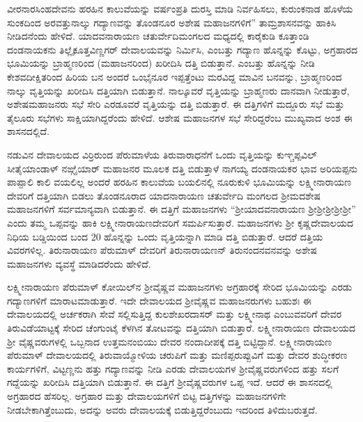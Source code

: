 ವೀರನಾರಸಿಂಹದೇವನು ಹರಹಿನ ಕಾಲುವೆಯನ್ನು ವರ್ಷಂಪ್ರತಿ ದುರಸ್ತಿ ಮಾಡಿ ನಿರ್ವಹಿಸಲು, ಕುರುಂಕನಾಡ ಹೊಳೆಯ ಸುಂಕದಿಂದ ಅರವತ್ತುನಾಲ್ಕು ಗದ್ಯಾಣವನ್ನು ತೊಂಡನೂರ ಅಶೇಷ ಮಹಾಜನಗಳಿಗೆ” ತಾಮ್ರಶಾಸನವನ್ನು ಹಾಕಿಸಿ ನೀಡಿದನೆಂದು ಹೇಳಿದೆ. ಯಾದವನಾರಾಯಣ ಚತುರ್ವೇದಿಮಂಗಲದ ಮಧ್ಯದಲ್ಲಿ ಕಾರೈಕುಡಿ ಕೂತ್ತಾಂಡಿ ದಂಡನಾಯಕನು ತಿಲ್ಲೈಕೂತ್ತವಿಣ್ಣಗರ್​ ದೇವಾಲಯವನ್ನು ನಿರ್ಮಿಸಿ, ಎಂಬತ್ತು ಗದ್ಯಾಣ ಹೊನ್ನನ್ನು ಕೊಟ್ಟು, ಅಗ್ರಹಾರದ ಭೂಮಿಯನ್ನು ಬ್ರಾಹ್ಮಣರಿಂದ (ಮಹಾಜನರಿಂದ) ಖರೀದಿಸಿ ದತ್ತಿ ಬಿಡುತ್ತಾನೆ. ಎಂಬತ್ತು ಹೊನ್ನನ್ನು ನೀಡಿ ಕೇಶವದೀಕ್ಷಿತರಿಂದ ಹಿರಿಯ ಬನ ಅಂದರೆ ಒಂಭೈನೂರ ಇಪ್ಪತ್ತೆಂಟು ಮರವಿದ್ದ ಮಾವಿನ ಬನವನ್ನು, ಬ್ರಾಹ್ಮಣರಿಂದ ನಾಲ್ಕು ವೃತ್ತಿಯನ್ನು ಖರೀದಿಸಿ ದತ್ತಿಯಾಗಿ ಬಿಡುತ್ತಾನೆ. ನಾಲ್ಕೂವರೆ ವೃತ್ತಿಯನ್ನು ಬ್ರಾಹ್ಮಣರು ದಾನವಾಗಿ ನೀಡುತ್ತಾರೆ, ಅಶೇಷಮಹಾಜನರು ಸಭೆ ಸೇರಿ ಎರಡೂವರೆ ವೃತ್ತಿಯನ್ನು ದತ್ತಿ ಬಿಡುತ್ತಾರೆ. ಈ ದತ್ತಿಗಳಿಗೆ ಮದ್ದೂರು ಸಭೆ ಮತ್ತು ತೈಲೂರು ಸಭೆಗಳು ಸಾಕ್ಷಿಯಾಗಿದ್ದರೆಂದು ಹೇಳಿದೆ. ಆಶೇಷ ಮಹಾಜನಗಳ ಸಭೆ ಸೇರಿದ್ದರೆಂಬ ಮುಖ್ಯವಾದ ಅಂಶ ಈ ಶಾಸನದಲ್ಲಿದೆ.

ನಡುವಿನ ದೇವಾಲಯದ ವಿರ್ರಿರುಂದ ಪೆರುಮಾಳೆಯ ತಿರುವಾರಾಧನೆಗೆ ಒಂದು ವೃತ್ತಿಯನ್ನು ಕುಞ್ಚಪ್ಪವಿಲ್​ ಸೀತೈಯಾಂಡಾಳ್​ ನಙ್ಗೈಯಾರ್​ ಮಹಾಜನರ ಮೂಲಕ ದತ್ತಿ ಬಿಡುತ್ತಾಳೆ ನಾಗಯ್ಯ ದಂಡನಾಯಕರ ಭಾವ ಅರಿಯಪ್ಪನು ಪಾಪ್ಪಾಲಿ ಕಾಲಿ ವಯಲಿಲ್ಲ ಅಂದರೆ ಹರಹಿನ ಕಾಲುವೆಯ ಬಯಲಿನಲ್ಲಿ ನೂರುಕುಳಿ ಭೂಮಿಯನ್ನು ಲಕ್ಷ್ಮೀನಾರಾಯಣ ದೇವರಿಗೆ ದತ್ತಿಯಾಗಿ ಬಿಡಲು ತೊಂಡನೂರಾದ ಯಾದನಾರಾಯಣ ಚತುರ್ವೇದಿ ಮಂಗಲದ ಶ‍್ರೀಮದಶೇಷ ಮಹಾಜನಗಳಿಗೆ ಸರ್ವಮಾನ್ಯವಾಗಿ ಬಿಡುತ್ತಾನೆ. ಈ ದತ್ತಿಗೆ ಮಹಾಜನಗಳು “ಶ‍್ರೀಯಾದವನಾರಾಯಣ ಶ‍್ರೀಶ‍್ರೀಶ‍್ರೀಶ‍್ರೀಶ‍್ರೀ” ಎಂದು ತಮ್ಮ ಒಪ್ಪವನ್ನು ಹಾಕಿ ಲಕ್ಷ್ಮೀನಾರಾಯಣದೇವರಿಗೆ ಸಮರ್ಪಿಸುತ್ತಾರೆ. ಮಹಾಜನಗಳು ಶ‍್ರೀ ಕೃಷ್ಣದೇವಾಲಯದ ನಿಧಿಯ ಬಡ್ಡಿಯಿಂದ ಬಂದ 20 ಹೊನ್ನನ್ನು ಒಂದು ವೃತ್ತಿಯನ್ನಾಗಿ ಮಾಡಿ ದತ್ತಿ ಬಿಡುತ್ತಾರೆ. ಆದರೆ ದತ್ತಿಯ ವಿವರಗಳಿಲ್ಲ. ತಿರುನಾರಾಯಣ ಪೆರುಮಾಳ್​ ದೇವರಿಗೆ ತಿರುನಾರಾಯಣನ್​ ತಿರುನಂದನವನವನ್ನು ಅಶೇಷ ಮಹಾಜನಗಳು ವ್ಯವಸ್ಥೆ ಮಾಡಿದರೆಂದು ಹೇಳಿದೆ.

ಲಕ್ಷ್ಮೀನಾರಾಯಣ ಪೆರುಮಾಳ್​ ಕೋಯಿಲ್​ನ ಶ‍್ರೀವೈಷ್ಣವ ಮಹಾಜನಗಳು ಅಗ್ರಹಾರಕ್ಕೆ ಸೇರಿದ ಭೂಮಿಯನ್ನು ಎರಡು ಗದ್ಯಾಣಗಳಿಗೆ ಮಾರಾಟಮಾಡುತ್ತಾರೆ. ಇದೇ ದೇವಾಲಯದ ಶ‍್ರೀವೈಷ್ಣವ ಮಹಾಜನರುಗಳು ಬಹುಶಃ ಈ ದೇವಾಲಯದಲ್ಲಿ ಅರ್ಚಕರಾಗಿ ಸೇವೆ ಸಲ್ಲಿಸುತ್ತಿದ್ದ ಕುಲಶೇಖರದಾಸರ್​ ಮತ್ತು ಲಕ್ಷ್ಮೀನಾಥ ಎಂಬುವವರಿಗೆ ದೇವರ ತಿರುವಿಡೆಯಾಟ್ಟಕ್ಕೆ ಸೇರಿದ ಚೆಂಗುಂಟೈ ಕೆಳಗಿನ ತೋಟವನ್ನು ದತ್ತಿಯಾಗಿ ಬಿಡುತ್ತಾರೆ. ಲಕ್ಷ್ಮೀನಾರಾಯಣ ದೇವಾಲಯದ ಶ‍್ರೀ ವೈಷ್ಣವರುಗಳಲ್ಲಿ ಒಬ್ಬನಾದ ಉತ್ತಮನಂಬಿಯು ದೇವರ ನಂದಾದೀಪಕ್ಕೆ ದತ್ತಿ ಬಿಟ್ಟಿದ್ದಾನೆ. ಲಕ್ಷ್ಮೀನಾರಾಯಣ ಪೆರುಮಾಳ್​ ದೇವಾಲಯದಲ್ಲಿ ತಿರುವಾಯ್ಮೋಳಿಯ ಚರುಪಿಗೆ ಮತ್ತು ಮಣಿಪ್ಪರುಪ್ಪುವಿಗೆ ಮತ್ತು ದೇವರ ಶುದ್ಧೀಕರಣ ಕಾರ್ಯಗಳಿಗೆ, ವಿಟ್ಟಣ್ಣನು ಹತ್ತು ಗದ್ಯಾಣವನ್ನು ನೀಡಿ ಎರಡು ದೇವಾಲಯಗಳ ಶ‍್ರೀವೈಷ್ಣವರುಗಳಿಂದ ಹತ್ತು ಸಲಗೆ ಗದ್ದೆಯನ್ನು ಖರೀದಿಸಿ ದತ್ತಿಯಾಗಿ ಬಿಡುತ್ತಾನೆ. ಈ ದತ್ತಿಗೆ ಶ‍್ರೀವೈಷ್ಣವರುಗಳ ಒಪ್ಪ ಇದೆ. ಆದರೆ ಈ ಶಾಸನದಲ್ಲಿ ಅಗ್ರಹಾರದ ಹೆಸರಿಲ್ಲ. ಅಗ್ರಹಾರ ಮತ್ತು ದೇವಾಲಯಗಳಿಗೆ ಬಿಟ್ಟ ದತ್ತಿಗಳನ್ನು ಮಹಾಜನಗಳಿಗೇ ನೀಡಬೇಕಾಗಿತ್ತೆಂಬುದು, ಅದನ್ನು ಅವರು ದೇವಾಲಯಕ್ಕೆ ಬಿಡುತ್ತಿದ್ದರೆಂಬುದು ಇದರಿಂದ ತಿಳಿದುಬರುತ್ತದೆ.

